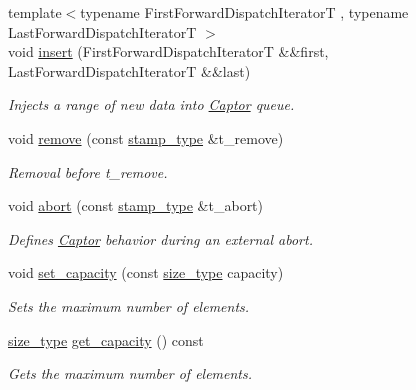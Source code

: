 \begin{DoxyCompactItemize}
{\footnotesize template$<$typename First\+Forward\+Dispatch\+IteratorT , typename Last\+Forward\+Dispatch\+IteratorT $>$ }\\void \hyperlink{classflow_1_1_captor_interface_a545a4d188f6069261854c9753893fa98}{insert} (First\+Forward\+Dispatch\+IteratorT \&\&first, Last\+Forward\+Dispatch\+IteratorT \&\&last)
\begin{DoxyCompactList}\small\item\em Injects a range of new data into \hyperlink{classflow_1_1_captor}{Captor} queue. \end{DoxyCompactList}\item 
void \hyperlink{classflow_1_1_captor_interface_a492c00041af4fe2cb92342482b0b59fe}{remove} (const \hyperlink{classflow_1_1_captor_interface_a2b87d20d17e8d1437941bd98fe514bc8}{stamp\+\_\+type} \&t\+\_\+remove)
\begin{DoxyCompactList}\small\item\em Removal before {\ttfamily t\+\_\+remove}. \end{DoxyCompactList}\item 
void \hyperlink{classflow_1_1_captor_interface_a313e147c9159cf2faf7b131bac8f4b54}{abort} (const \hyperlink{classflow_1_1_captor_interface_a2b87d20d17e8d1437941bd98fe514bc8}{stamp\+\_\+type} \&t\+\_\+abort)
\begin{DoxyCompactList}\small\item\em Defines \hyperlink{classflow_1_1_captor}{Captor} behavior during an external abort. \end{DoxyCompactList}\item 
void \hyperlink{classflow_1_1_captor_interface_a8068310b1ece5c53a11252919a62355a}{set\+\_\+capacity} (const \hyperlink{classflow_1_1_captor_interface_a62db6a158eebcb377e63ede6a1f1a8c6}{size\+\_\+type} capacity)
\begin{DoxyCompactList}\small\item\em Sets the maximum number of elements. \end{DoxyCompactList}\item 
\hyperlink{classflow_1_1_captor_interface_a62db6a158eebcb377e63ede6a1f1a8c6}{size\+\_\+type} \hyperlink{classflow_1_1_captor_interface_a84ee393ca53d595bb20057445334eb78}{get\+\_\+capacity} () const
\begin{DoxyCompactList}\small\item\em Gets the maximum number of elements. \end{DoxyCompactList}\item 
\mbox{\label{classflow_1_1_captor_interface_aaa637f69db2258f19c516d7e42c94bb4}} 

\end{DoxyCompactItemize}
